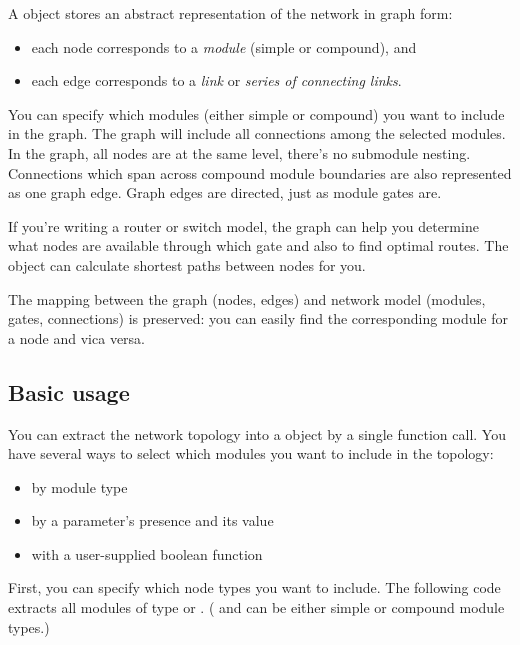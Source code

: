 A  object stores an abstract representation of the
network in graph form:
\begin{itemize}
  \item{each  node corresponds to a \textit{module}
    (simple or compound), and}
  \item{each  edge corresponds to a \textit{link} or
    \textit{series of connecting links}.}
\end{itemize}

You can specify which modules (either simple or compound) you want to
include in the graph. The graph will include all connections among the
selected modules. In the graph, all nodes are at the same level,
there's no submodule nesting.  Connections which span across compound
module boundaries are also represented as one graph edge. Graph edges
are directed, just as module gates are.


If you're writing a router or switch model, the 
graph can help you determine what nodes are available through which
gate and also to find optimal routes. The
 object can calculate shortest paths between nodes for you.

The mapping between the graph (nodes, edges) and network model
(modules, gates, connections) is preserved: you can easily find
the corresponding module for a  node and vica versa.





\subsection{Basic usage}

You can extract the network topology into a 
object by a single function call. You have several ways to select
which modules you want to include in the topology:
\begin{itemize}
  \item{by module type}
  \item{by a parameter's presence and its value}
  \item{with a user-supplied boolean function}
\end{itemize}

First, you can specify which node types you want to include. The
following code extracts all modules of type  or .
( and  can be either simple or compound module types.)

